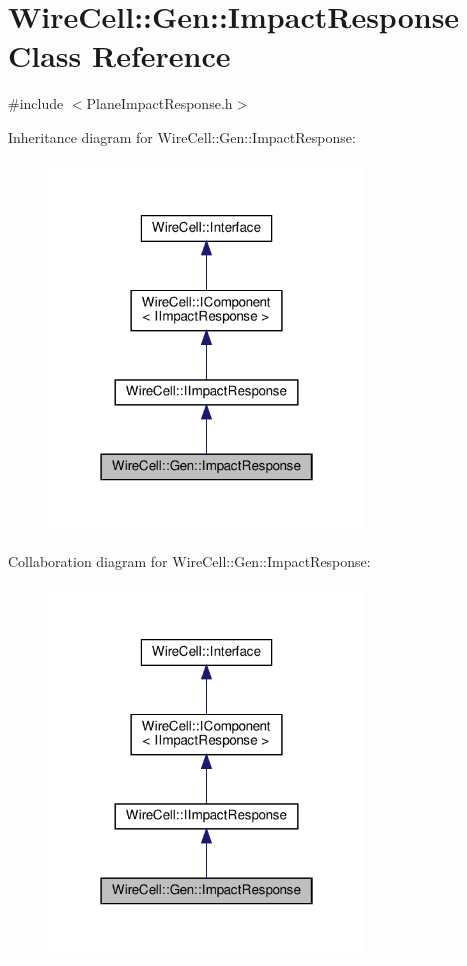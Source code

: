\hypertarget{class_wire_cell_1_1_gen_1_1_impact_response}{}\section{Wire\+Cell\+:\+:Gen\+:\+:Impact\+Response Class Reference}
\label{class_wire_cell_1_1_gen_1_1_impact_response}


{\ttfamily \#include $<$Plane\+Impact\+Response.\+h$>$}



Inheritance diagram for Wire\+Cell\+:\+:Gen\+:\+:Impact\+Response\+:
\nopagebreak
\begin{figure}[H]
\begin{center}
\leavevmode
\includegraphics[width=238pt]{class_wire_cell_1_1_gen_1_1_impact_response__inherit__graph}
\end{center}
\end{figure}


Collaboration diagram for Wire\+Cell\+:\+:Gen\+:\+:Impact\+Response\+:
\nopagebreak
\begin{figure}[H]
\begin{center}
\leavevmode
\includegraphics[width=238pt]{class_wire_cell_1_1_gen_1_1_impact_response__coll__graph}
\end{center}
\end{figure}
